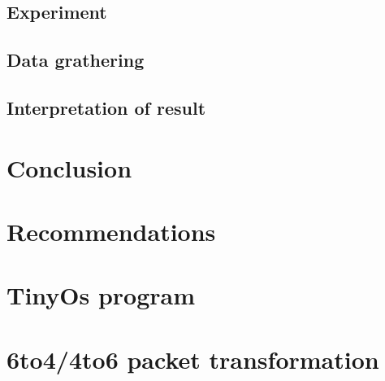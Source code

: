 \documentclass[12pt,a4paper,final]{report}
\begin{document}
\section{Experiment}
\section{Data grathering}
\section{Interpretation of result}
\chapter{Conclusion}

\chapter{Recommendations}

\mbox{}
\nocite{*}
 

\newpage
\listoffigures

\appendix

\chapter{TinyOs program}


\chapter{6to4/4to6 packet transformation}
\end{document}
